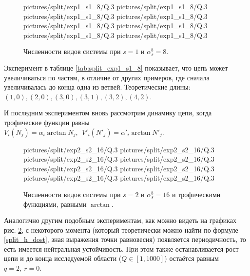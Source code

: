 \begin{figure}[H]
    \centering
       {pictures/split/exp1_s1_8/Q}{.3}
      {pictures/split/exp1_s1_8/Q}{.3}
      {pictures/split/exp1_s1_8/Q}{.3}
      {pictures/split/exp1_s1_8/Q}{.3}
      {pictures/split/exp1_s1_8/Q}{.3}
      {pictures/split/exp1_s1_8/Q}{.3}
      {pictures/split/exp1_s1_8/Q}{.3}
     {pictures/split/exp1_s1_8/Q}{.3}
\caption{Численности видов системы при \(s=1\) и \(\alpha^b_s = 8\).} \label{fig:split_exp1_s1_8}
\end{figure}
Эксперимент в таблице \ref{tab:split_exp1_s1_8} показывает, что цепь может увеличиваться по частям, в отличие от других примеров, где сначала увеличивалась до конца одна из ветвей. Теоретические длины: \( (1,0), (2,0), (3,0), (3,1), (3,2), (4,2) \).

И последним экспериментом вновь рассмотрим динамику цепи, когда трофические функции равны \(V_i(N_j) = \alpha_i \arctan{N_j}, ~~ V'_i(N'_j) = \alpha'_i \arctan{N'_j}\).
\begin{figure}[H]
    \centering
       {pictures/split/exp2_s2_16/Q}{.3}
       {pictures/split/exp2_s2_16/Q}{.3}
      {pictures/split/exp2_s2_16/Q}{.3}
      {pictures/split/exp2_s2_16/Q}{.3}
      {pictures/split/exp2_s2_16/Q}{.3}
      {pictures/split/exp2_s2_16/Q}{.3}
      {pictures/split/exp2_s2_16/Q}{.3}
     {pictures/split/exp2_s2_16/Q}{.3}
\caption{Численности видов системы при \(s=2\) и \(\alpha^b_s = 16\) и трофическими функциями, равными \(\arctan\).} \label{fig:split_exp2_s2_16}
\end{figure}
Аналогично другим подобным экспериментам, как можно видеть на графиках рис. \ref{fig:split_exp2_s2_16}, с некоторого момента (который теоретически можно найти по формуле \eqref{split_h_dost}, зная выражения точки равновесия) появляется периодичность, то есть имеется нейтральная устойчивость. При этом также останавливается рост цепи и до конца исследуемой области (\(Q \in [1, 1000]\)) остаётся равным \(q=2, ~ r=0\).